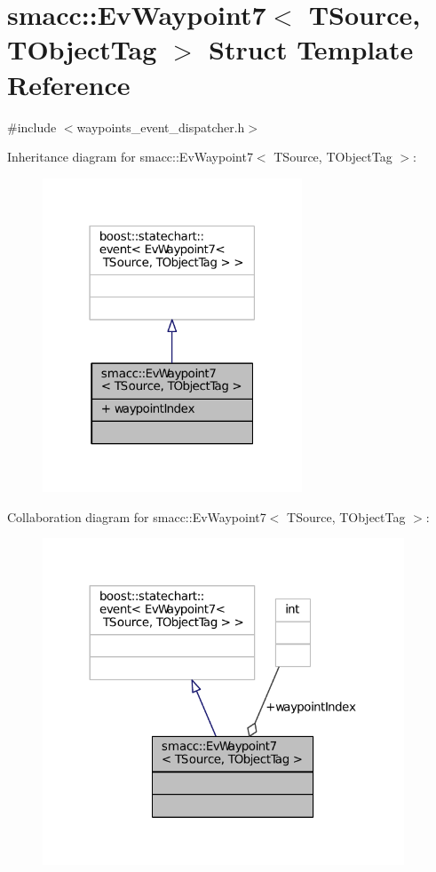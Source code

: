 \hypertarget{structsmacc_1_1EvWaypoint7}{}\section{smacc\+:\+:Ev\+Waypoint7$<$ T\+Source, T\+Object\+Tag $>$ Struct Template Reference}
\label{structsmacc_1_1EvWaypoint7}


{\ttfamily \#include $<$waypoints\+\_\+event\+\_\+dispatcher.\+h$>$}



Inheritance diagram for smacc\+:\+:Ev\+Waypoint7$<$ T\+Source, T\+Object\+Tag $>$\+:
\nopagebreak
\begin{figure}[H]
\begin{center}
\leavevmode
\includegraphics[width=219pt]{structsmacc_1_1EvWaypoint7__inherit__graph}
\end{center}
\end{figure}


Collaboration diagram for smacc\+:\+:Ev\+Waypoint7$<$ T\+Source, T\+Object\+Tag $>$\+:
\nopagebreak
\begin{figure}[H]
\begin{center}
\leavevmode
\includegraphics[width=305pt]{structsmacc_1_1EvWaypoint7__coll__graph}
\end{center}
\end{figure}
